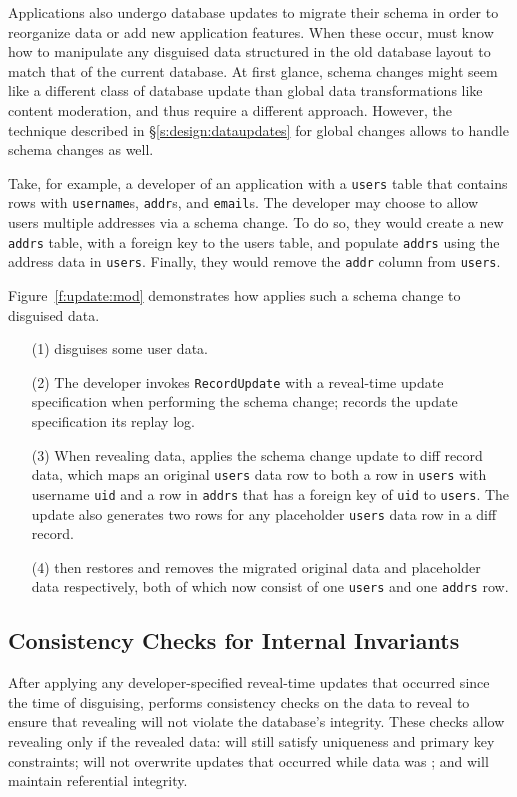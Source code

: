 %
Applications also undergo database updates to migrate their schema in
order to reorganize data or add new application features. When these occur, \sys
must know how to manipulate any disguised data structured in the old database
layout to match that of the current database.
%
At first glance, schema changes might seem like a different class of
database update than global data transformations like content moderation, and
thus require a different approach.
%
However, the technique described in \S\ref{s:design:dataupdates} for global 
changes allows \sys to handle schema changes as well. 
%

%
Take, for example, a developer of an application with a \texttt{users} table
that contains rows with \texttt{username}s, \texttt{addr}s, and \texttt{email}s.
The developer may choose to allow users multiple addresses via a schema
change. To do so, they would create a new \texttt{addrs} table, with a
foreign key to the users table, and populate \texttt{addrs} using the address
data in \texttt{users}.  Finally, they would remove the \texttt{addr} column
from \texttt{users}.
%

Figure~\ref{f:update:mod} demonstrates how \sys applies such a schema change 
to disguised data.  \begin{enumerate}[nosep]
    \item[(1)] \sys disguises some user data.
    \item[(2)] The developer invokes \texttt{RecordUpdate} with a reveal-time update
        specification when 
performing the schema change; \sys records the update specification its replay log.
    \item[(3)] When revealing data, \sys applies the schema change update
        to diff record data, which maps an original \texttt{users} data row to
        both
    a row in \texttt{users} with username \texttt{uid} and a row in
\texttt{addrs} that has a foreign key of \texttt{uid} to \texttt{users}.
%
The update also generates two rows for any placeholder \texttt{users}
data row in a diff record.
%
\item[(4)] \sys then restores and removes the migrated original data and placeholder
        data respectively, both of which now consist of one \texttt{users} and
        one \texttt{addrs} row.
\end{enumerate}

\subsection{Consistency Checks for Internal Invariants} 
After applying any developer-specified reveal-time updates that occurred since
the time of disguising, \sys performs consistency checks on the data to reveal
to ensure that revealing will not violate the database's integrity.
%
These checks allow revealing only if the revealed data: \one{} will still
satisfy uniqueness and primary key constraints; \two{} will not overwrite
updates that occurred while data was \xxed; and \three{} will maintain
referential integrity.

